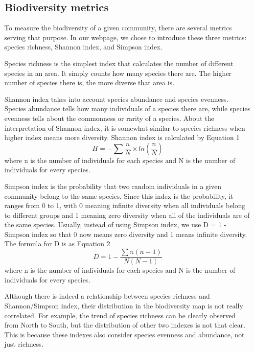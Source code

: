 \documentclass{article}
\begin{document}
\subsection{Biodiversity metrics}
To measure the biodiversity of a given community, there are several metrics serving that purpose. In our webpage, we chose to introduce these three metrics: species richness, Shannon index, and Simpson index. 
\par
Species richness is the simplest index that calculates the number of different species in an area. It simply counts how many species there are. The higher number of species there is, the more diverse that area is.
\par
Shannon index takes into account species abundance and species evenness. Species abundance tells how many individuals of a species there are, while species evenness tells about the commonness or rarity of a species. About the interpretation of Shannon index, it is somewhat similar to species richness when higher index means more diversity. Shannon index is calculated by Equation 1
\begin{equation}
	H = - \sum \frac{n}{N} \times ln(\frac{n}{N})
\end{equation}
where n is the number of individuals for each species and N is the number of individuals for every species.
\par
Simpson index is the probability that two random individuals in a given community belong to the same species. Since this index is the probability, it ranges from 0 to 1, with 0 meaning infinite diversity when all individuals belong to different groups and 1 meaning zero diversity when all of the individuals are of the same species. Usually, instead of using Simpson index, we use D = 1 - Simpson index so that 0 now means zero diversity and 1 means infinite diversity. The formula for D is as Equation 2
\begin{equation}
	D = 1 - \frac{\sum n(n-1)}{N(N-1)}
\end{equation}
where n is the number of individuals for each species and N is the number of individuals for every species.
\par
Although there is indeed a relationship between species richness and Shannon/Simpson index, their distribution in the biodiversity map is not really correlated. For example, the trend of species richness can be clearly observed from North to South, but the distribution of other two indexes is not that clear. This is because these indexes also consider species evenness and abundance, not just richness.
\end{document}
